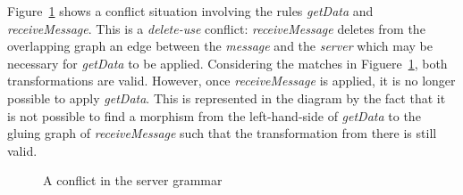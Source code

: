 \begin{example}
  Figure~\ref{fig:gts:conflict} shows a conflict situation involving the rules \emph{getData} and \emph{receiveMessage}. This is a \emph{delete-use} conflict: \emph{receiveMessage} deletes from the overlapping graph an edge between the \emph{message} and the \emph{server} which may be necessary for \emph{getData} to be applied. Considering the matches in Figuere~\ref{fig:gts:conflict}, both transformations are valid. However, once \emph{receiveMessage} is applied, it is no longer possible to
  apply \emph{getData}. This is represented in the diagram by the fact that it is not possible to find a morphism from the left-hand-side of \emph{getData} to the gluing graph of \emph{receiveMessage} such that the transformation from there is still valid.

\begin{figure}[!ht]
  \centering
  \caption{A conflict in the server grammar}\label{fig:gts:conflict}
\end{figure}

\end{example}
